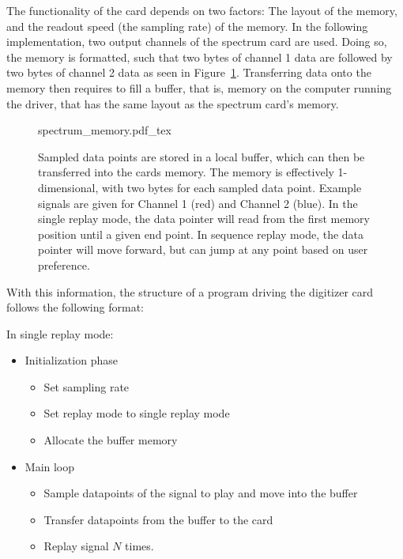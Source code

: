 The functionality of the card depends on two factors: The layout of the memory, and the readout speed (the sampling rate) of the memory. In the following implementation, two output channels of the spectrum card are used. Doing so, the memory is formatted, such that two bytes of channel 1 data are followed by two bytes of channel 2 data as seen in Figure~\ref{fig:spectrum_memory}. Transferring data onto the memory then requires to fill a buffer, that is, memory on the computer running the driver, that has the same layout as the spectrum card's memory.
\begin{figure}[ht]
\label{fig:spectrum_memory}
\centering
	{spectrum_memory.pdf_tex}
	\caption{Sampled data points are stored in a local buffer, which can then be transferred into the cards memory. The memory is effectively 1-dimensional, with two bytes for each sampled data point. Example signals are given for Channel 1 (red) and Channel 2 (blue). In the single replay mode, the data pointer will read from the first memory position until a given end point. In sequence replay mode, the data pointer will move forward, but can jump at any point based on user preference.}
\end{figure}

With this information, the structure of a program driving the digitizer card follows the following format:

\begin{minipage}{\textwidth}
In single replay mode:

\begin{itemize}
\setlength\itemsep{0.0em}
	\item Initialization phase
		\begin{itemize}
			\item Set sampling rate
			\item Set replay mode to single replay mode
			\item Allocate the buffer memory
		\end{itemize}
	\item Main loop
		\begin{itemize}
			\item Sample datapoints of the signal to play and move into the buffer
			\item Transfer datapoints from the buffer to the card
			\item Replay signal $N$ times.
		\end{itemize}
\end{itemize}
\end{minipage}

